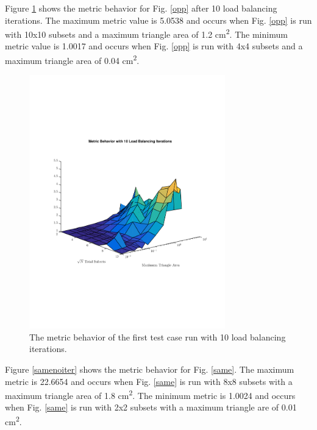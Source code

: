 \documentclass{anstrans}
\begin{document}
Figure \ref{oppiter} shows the metric behavior for Fig. \ref{opp} after 10 load balancing iterations. The maximum metric value is 5.0538 and occurs when Fig. \ref{opp} is run with 10x10 subsets and a maximum triangle area of 1.2 cm\textsuperscript{2}. The minimum metric value is 1.0017 and occurs when Fig. \ref{opp} is run with 4x4 subsets and a maximum triangle area of 0.04 cm\textsuperscript{2}.

\begin{figure}
\centering
\includegraphics[width=85mm, trim = 0cm 5cm 0cm 5cm,clip]{figures/OppIter.pdf}
\caption{The metric behavior of the first test case run with 10 load balancing iterations.}
\label{oppiter}
\end{figure}

Figure \ref{samenoiter} shows the metric behavior for Fig. \ref{same}. The maximum metric is 22.6654 and occurs when Fig. \ref{same} is run with 8x8 subsets with a maximum triangle area of 1.8 cm\textsuperscript{2}. The minimum metric is 1.0024 and occurs when Fig. \ref{same} is run with 2x2 subsets with a maximum triangle are of 0.01 cm\textsuperscript{2}.
\end{document}

